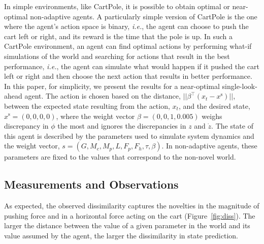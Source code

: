 In simple environments, like CartPole, it is possible to obtain optimal or near-optimal non-adaptive agents. A particularly simple version of CartPole is the one where the agent’s action space is binary, \textit{i.e.}, the agent can choose to push the cart left or right, and its reward is the time that the pole is up. In such a CartPole environment, an agent can find optimal actions by performing what-if simulations of the world and searching for actions that result in the best performance, \textit{i.e.}, the agent can simulate what would happen if it pushed the cart left or right and then choose the next action that results in better performance.  In this paper, for simplicity, we present the results for a near-optimal single-look-ahead agent. 
The action is chosen based on the distance, $||\beta^\intercal (x_t-x^\text{s})||$, between the expected state resulting from the action, $x_t$, and the desired state, $x^\text{s}=(0,0,0,0)$, where the weight vector $\beta=(0,0,1,0.005)$ weighs discrepancy in $\phi$ the most and ignores the discrepancies in $z$ and $\dot{z}$.
The state of this agent is described by the parameters used to simulate system dynamics and the weight vector, $s=(G, M_c, M_p, L, F_p, F_h, \tau, \beta)$. In non-adaptive agents, these parameters are fixed to the values that correspond to the non-novel world. 

\subsection{Measurements and Observations}

As expected, the observed dissimilarity captures the novelties in the magnitude of pushing force and in a horizontal force acting on the cart (Figure~\ref{fig:diss}). The larger the distance between the value of a given parameter in the world and its value assumed by the agent, the larger the dissimilarity in state prediction.

